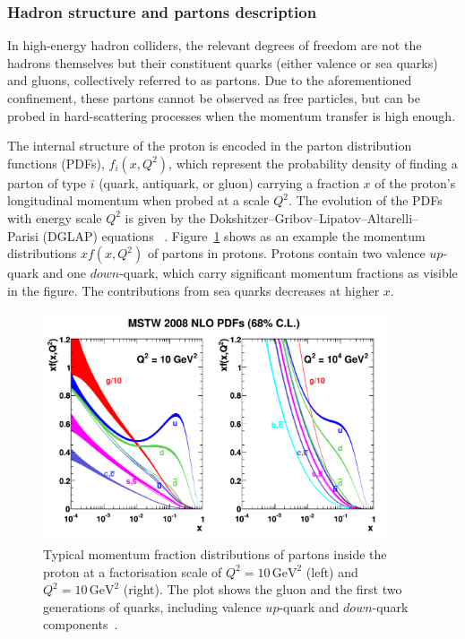\subsubsection*{Hadron structure and partons description}
\label{subsec:proton}

In high-energy hadron colliders, the relevant degrees of freedom are not the hadrons themselves but their constituent quarks (either valence or sea quarks) and gluons, collectively referred to as partons. Due to the aforementioned confinement, these partons cannot be observed as free particles, but can be probed in hard-scattering processes when the momentum transfer is high enough.

The internal structure of the proton is encoded in the parton distribution functions (PDFs), \(f_i(x, Q^2)\), which represent the probability density of finding a parton of type \(i\) (quark, antiquark, or gluon) carrying a fraction \(x\) of the proton's longitudinal momentum when probed at a scale \(Q^2\). The evolution of the PDFs with energy scale $Q^2$ is given by the Dokshitzer–Gribov–Lipatov–Altarelli–\\Parisi (DGLAP) equations ~\cite{Gribov, ALTARELLI, Dokshitzer}. Figure~\ref{fig:pdfs} shows as an example the momentum distributions $xf(x,Q^2)$ of partons in protons. Protons contain two valence $up$-quark and one $down$-quark, which carry significant momentum fractions as visible in the figure. The contributions from sea quarks decreases at higher $x$.
\begin{figure}[htbp]
  \centering
  \includegraphics[width=0.9\textwidth]{images/pdfs.pdf}
  \caption{Typical momentum fraction distributions of partons inside the proton at a factorisation scale of \(Q^2 = 10\,\text{GeV}^2\) (left) and \(Q^2 = 10\,\text{GeV}^2\) (right). The plot shows the gluon and the first two generations of quarks, including valence $up$-quark and $down$-quark components~\cite{Martin_2009}.}
  \label{fig:pdfs}
\end{figure}

